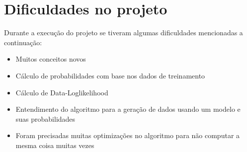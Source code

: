 \section{Dificuldades no projeto}
Durante a execução do projeto se tiveram algumas dificuldades mencionadas a continuação:
\begin{itemize}
	\item Muitos conceitos novos
	\item Cálculo de probabilidades com base nos dados de treinamento
	\item Cálculo de Data-Loglikelihood
	\item Entendimento do algoritmo para a geração de dados usando um modelo e suas probabilidades
	\item Foram precisadas muitas optimizações no algoritmo para não computar a mesma coisa muitas vezes

\end{itemize}